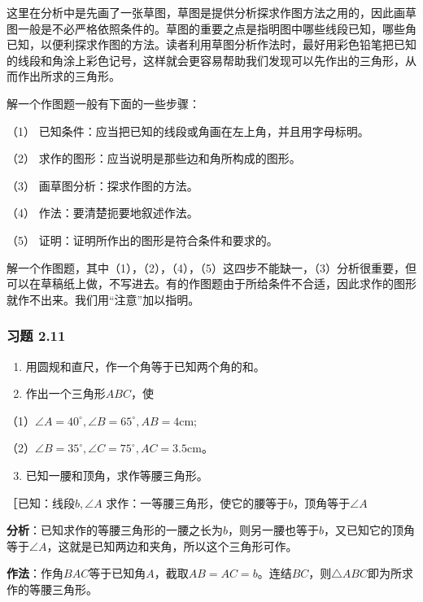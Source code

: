 这里在分析中是先画了一张草图，草图是提供分析探求作图方法之用的，因此画草图一般是不必严格依照条件的。草图的重要之点是指明图中哪些线段已知，哪些角已知，以便利探求作图的方法。读者利用草图分析作法时，最好用彩色铅笔把已知的线段和角涂上彩色记号，这样就会更容易帮助我们发现可以先作出的三角形，从而作出所求的三角形。

解一个作图题一般有下面的一些步骤：

（1） 已知条件：应当把已知的线段或角画在左上角，并且用字母标明。

（2） 求作的图形：应当说明是那些边和角所构成的图形。

（3） 画草图分析：探求作图的方法。

（4） 作法：要清楚扼要地叙述作法。

（5） 证明：证明所作出的图形是符合条件和要求的。

解一个作图题，其中（1），（2），（4），（5）这四步不能缺一，（3）分析很重要，但可以在草稿纸上做，不写进去。有的作图题由于所给条件不合适，因此求作的图形就作不出来。我们用``注意''加以指明。

\subsubsection{习题 2.11}

\begin{enumerate}
\item
  用圆规和直尺，作一个角等于已知两个角的和。
\item
  作出一个三角形\(ABC\)，使
\end{enumerate}

（1）\(\angle A = 40^{\circ}, \angle B = 65^{\circ}, AB = 4\mathrm{cm};\)

（2）\(\angle B = 35^{\circ}, \angle C = 75^{\circ}, AC = 3.5\mathrm{cm}\)。

\begin{enumerate}
\setcounter{enumi}{2}
\item
  已知一腰和顶角，求作等腰三角形。
\end{enumerate}

［已知：线段\(b, \angle A\)
求作：一等腰三角形，使它的腰等于\(b\)，顶角等于\(\angle A\)

\textbf{分析}：已知求作的等腰三角形的一腰之长为\(b\)，则另一腰也等于\(b\)，又已知它的顶角等于\(\angle A\)，这就是已知两边和夹角，所以这个三角形可作。

\textbf{作法}：作角\(BAC\)等于已知角\(A\)，截取\(AB = AC = b\)。连结\(BC\)，则\(\triangle ABC\)即为所求作的等腰三角形。

